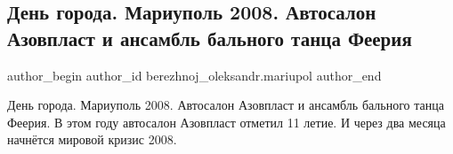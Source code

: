  
 
 
 
 

\subsection{День города. Мариуполь 2008. Автосалон Азовпласт и ансамбль бального танца Феерия}
\label{sec:24_03_2020.fb.berezhnoj_oleksandr.mariupol.1.den_goroda__mariupol}

\ifcmt
 author_begin
   author_id berezhnoj_oleksandr.mariupol
 author_end
\fi

День города. Мариуполь 2008. Автосалон Азовпласт и ансамбль бального танца
Феерия. В этом году автосалон Азовпласт отметил 11 летие. И через два месяца
начнётся мировой кризис 2008.
